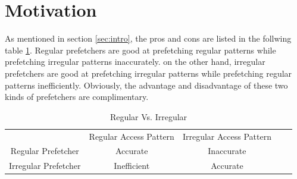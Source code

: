 \section{Motivation}
\label{sec:motivation}
As mentioned in section \ref{sec:intro}, the pros and cons are listed in the follwing table \ref{table:regVsirreg}.
Regular prefetchers are good at prefetching regular patterns while prefetching irregular patterns inaccurately. on the other hand, irregular prefetchers are good at prefetching irregular patterns while prefetching regular patterns inefficiently. Obviously, the advantage and disadvantage of these two kinds of prefetchers are complimentary.

\begin{table}[ht!]
\centering
\begin{tabular}{cccll}
\cline{1-3}
\multicolumn{1}{|c|}{}                     & \multicolumn{1}{c|}{Regular Access Pattern}             & \multicolumn{1}{c|}{Irregular Access Pattern}          &  &  \\ \cline{1-3}
\multicolumn{1}{|c|}{Regular Prefetcher}   & \multicolumn{1}{c|}{Accurate}              & \multicolumn{1}{c|}{{\color[HTML]{FE0000} Inaccurate}} &  &  \\ \cline{1-3}
\multicolumn{1}{|c|}{Irregular Prefetcher} & \multicolumn{1}{c|}{{\color[HTML]{FE0000} Inefficient}} & \multicolumn{1}{c|}{Accurate} &  &  \\ \cline{1-3}
\end{tabular}
\caption{Regular Vs. Irregular}
\label{table:regVsirreg}
\end{table}

